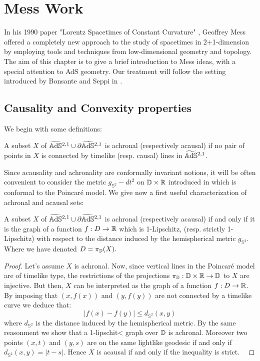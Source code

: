 \chapter{Mess Work}

In his 1990 paper "Lorentz Spacetimes of Constant Curvature" \cite{Mess}, Geoffrey Mess offered a completely new approach to the study of spacetimes in 2+1-dimension by employing tools and techniques from low-dimensional geometry and topology. The aim of this chapter is to give a brief introduction to Mess ideas, with a special attention to AdS geometry. Our treatment will follow the setting introduced by Bonsante and Seppi in \cite{bonsanteseppi}.

\section{Causality and Convexity properties}
We begin with some definitions:
\begin{definition}
    A subset $X$ of $\widetilde{\mathbb{A}\mathrm{d}\mathbb{S}}{}^{2,1}\cup \partial\widetilde{\mathbb{A}\mathrm{d}\mathbb{S}}{}^{2,1}$ is achronal (respectively acausal) if no pair of points in $X$ is connected by timelike (resp. causal) lines in $\widetilde{\mathbb{A}\mathrm{d}\mathbb{S}}{}^{2,1}$.
\end{definition}
Since acausality and achronality are conformally invariant notions, it will be often convenient to consider the metric $g_{\mathbb{S}^2}-dt^2$ on $\mathbb{D}\times\mathbb{R}$ introduced in  which is conformal to the Poincaré model. We give now a first useful characterization of achronal and acausal sets:
\begin{lemma}
    A subset $X$ of $\widetilde{\mathbb{A}\mathrm{d}\mathbb{S}}{}^{2,1}\cup \partial\widetilde{\mathbb{A}\mathrm{d}\mathbb{S}}{}^{2,1}$ is achronal (respectively acausal) if and only if it is the graph of a function $f:D\to\mathbb{R}$ which is 1-Lipschitz, (resp. strictly 1-Lipschitz) with respect to the distance induced by the hemispherical metric $g_{\mathbb{S}^2}$.\\
    Where we have denoted $D=\pi_{\mathbb{D}}(X).$ 
\end{lemma}
\begin{proof}
     Let's assume $X$ is achronal. Now, since vertical lines in the Poincaré model are of timelike type, the restrictions of the projections $\pi_{\mathbb{D}}:\mathbb{D}\times\mathbb{R}\to\mathbb{D}$ to $X$ are injective. But then, $X$ can be interpreted as the graph of a function $f:D\to\mathbb{R}$. By imposing that $(x,f(x))$ and $(y,f(y))$ are not connected by a timelike curve we deduce that: 
     \begin{equation}\label{soloqua}
        |f(x)-f(y)|\leq d_{\mathbb{S}^2}(x,y)
     \end{equation}
     where $d_{\mathbb{S}^2}$ is the distance induced by the hemispherical metric. By the same reasonment we show that a 1-lipschit< graph over $\mathbb{D}$ is achronal. Moreover two points $(x,t)$ and $(y,s)$ are on the same lightlike geodesic if and only if $d_{\mathbb{S}^2}(x,y)=|t-s|$. Hence $X$ is acausal if and only if the inequality  is strict. \
\end{proof}


